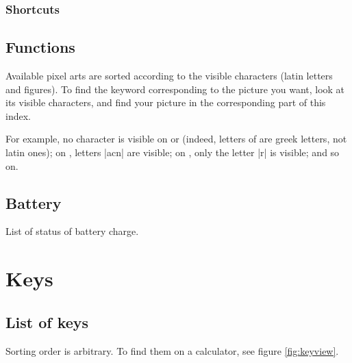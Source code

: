 \documentclass{ltxdoc}
\begin{document}
 \begin{multicols}{2}
 
 \end{multicols}

 \subsubsection{Shortcuts}

 \begin{multicols}{2}
 
 \end{multicols}

 \subsection{Functions}
 \label{sec:function}

 Available pixel arts are sorted according to the visible characters (latin letters and figures). To find the keyword corresponding to the picture you want, look at its visible characters, and find your picture in the corresponding part of this index.

 For example, no character is visible on  or  (indeed, letters of  are greek letters, not latin ones); on , letters |acn| are visible; on , only the letter |r| is visible; and so on.

 \begin{multicols}{3}
 
 \end{multicols}

 \subsection{Battery}
 \label{sec:battery}

 List of status of battery charge.

 \begin{multicols}{3}
 
 \end{multicols}

 \section{Keys}
 \label{sec:keys}

 \subsection{List of keys}

 Sorting order is arbitrary. To find them on a calculator, see figure \ref{fig:keyview}.

 

 \label{sec:keylist}
 \begin{multicols}{3}
 
 \end{multicols}

 \listoffigures
\end{document}
